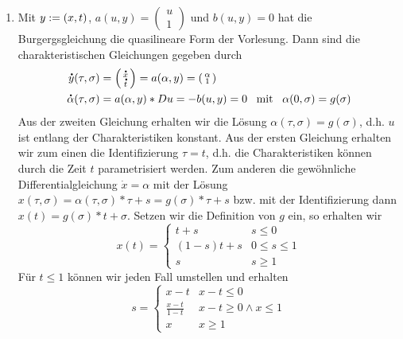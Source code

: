 \begin{exercisePage}
\begin{enumerate}[label=(zu \alph*), leftmargin=*]
	\item Mit $y \defeq (x,t)$, $a(u,y) = \left( \begin{smallmatrix} u \\ 1 \end{smallmatrix} \right)$ und $b(u,y) = 0$ hat die Burgergsgleichung die quasilineare Form der Vorlesung. Dann sind die charakteristischen Gleichungen gegeben durch
	\begin{equation*}
		\begin{aligned}
			\dot{y}(\tau, \sigma) &= \left( \begin{smallmatrix} \dot{x} \\ \dot{t} \end{smallmatrix} \right) = a(\alpha, y) = \left( \begin{smallmatrix} \alpha \\ 1 \end{smallmatrix} \right) \\
			\dot{\alpha}(\tau, \sigma) &= a(\alpha, y) * Du = - b(u,y) = 0 \enskip \mit \enskip \alpha(0,\sigma) = g(\sigma)
		\end{aligned}
	\end{equation*}
	Aus der zweiten Gleichung erhalten wir die Lösung $\alpha(\tau, \sigma) = g(\sigma)$, d.h. $u$ ist entlang der Charakteristiken konstant. Aus der ersten Gleichung erhalten wir zum einen die Identifizierung $\tau = t$, d.h. die Charakteristiken können durch die Zeit $t$ parametrisiert werden. Zum anderen die gewöhnliche Differentialgleichung $\dot{x} = \alpha$ mit der Lösung $x(\tau, \sigma) = \alpha(\tau,\sigma) * \tau + s = g(\sigma) * \tau + s$ bzw. mit der Identifizierung dann $x(t) = g(\sigma) * t + \sigma$. Setzen wir die Definition von $g$ ein, so erhalten wir
	\begin{equation*}
		x(t) = \begin{cases}
			t + s       & s \le 0 \\
			(1-s) t + s & 0 \le s \le 1 \\
			s           & s \ge 1
		\end{cases}
	\end{equation*}
	Für $t \le 1$ können wir jeden Fall umstellen und erhalten
	\begin{equation*}
		s = \begin{cases}
			x - t & x - t \le 0\\
			\frac{x-t}{1-t} & x-t \ge 0 \land x \le 1 \\
			x & x \ge 1
		\end{cases}
	\end{equation*}

\end{enumerate}
\end{exercisePage}
